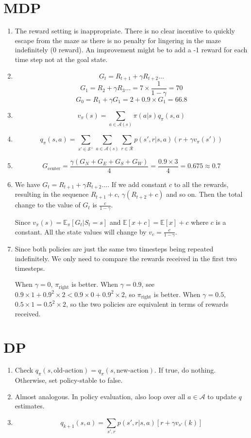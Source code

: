 \documentclass{article}
\newcommand{\allstates}{\mathcal{S}^+}
\newcommand{\actions}{\mathcal{A}}
\newcommand{\available}[1]{\mathcal{A}(#1)}
\newcommand{\rewards}{\mathcal{R}}
\newcommand{\rewardt}[1]{R_{#1}}
\newcommand{\policystateaction}[2]{\pi(#2|#1)}
\newcommand{\returnt}[1]{G_{#1}}
\newcommand{\valuestatepolicy}[2]{v_{#2}(#1)}
\newcommand{\valueaction}[2]{q_{#1}(#2)}
\newcommand{\Ex}{\mathbb{E}}
\begin{document}
\section{MDP}
\begin{enumerate}
    \item The reward setting is inappropriate. There is no clear incentive to quickly escape from the maze as there is no penalty for lingering in the maze indefinitely (0 reward). An improvement might be to add a -1 reward for each time step not at the goal state.
    \item \[ \returnt{t} = \rewardt{t+1} + \gamma \rewardt{t+2} \hdots \]
          \[ \returnt{1} = \rewardt{2} + \gamma \rewardt{3} \hdots = 7 \times \frac{1}{1-\gamma} = 70 \]
          \[ \returnt{0} = \rewardt{1} + \gamma\returnt{1} = 2 + 0.9 \times \returnt{1} = 66.8 \]
    \item \[ v_\pi(s) = \sum_{a \in \available{s}} \policystateaction{s}{a}\valueaction{\pi}{s, a} \]
    \item \[ \valueaction{\pi}{s, a} = \sum_{s' \in \allstates}\sum_{a \in \available{s}}\sum_{r \in \rewards} p(s', r|s, a)(r + \gamma\valuestatepolicy{s'}{\pi}) \]
    \item \[ G_{\text{center}} = \frac{\gamma(G_N + G_E + G_S + G_W)}{4} = \frac{0.9 \times 3}{4} = 0.675 \approx 0.7 \]
    \item We have $\returnt{t} = \rewardt{t+1} + \gamma\rewardt{t+2} \hdots$. If we add constant $c$ to all the rewards, resulting in the sequence $\rewardt{t+1}+c$, $\gamma(\rewardt{t+2}+c)$ and so on. Then the total change to the value of $\returnt{t}$ is $\frac{c}{1-\gamma}$.

          Since $v_\pi(s) = \Ex_\pi[G_t | S_t = s]$ and $\Ex[x+c] = \Ex[x] + c$ where $c$ is a constant. All the state values will change by $v_c = \frac{c}{1-\gamma}$.
    \item Since both policies are just the same two timesteps being repeated indefinitely. We only need to compare the rewards received in the first two timesteps.

          When $\gamma = 0$, $\pi_{\text{right}}$ is better. When $\gamma = 0.9$, see $0.9 \times 1 + 0.9^2 \times 2 < 0.9 \times 0 + 0.9^2 \times 2$, so $\pi_{\text{right}}$ is better. When $\gamma = 0.5$, $0.5 \times 1 = 0.5^2 \times 2$, so the two policies are equivalent in terms of rewards received.
\end{enumerate}

\section{DP}
\begin{enumerate}
    \item Check $\valueaction{\pi}{s, \text{old-action}} = \valueaction{\pi}{s, \text{new-action}}$. If true, do nothing. Otherwise, set policy-stable to false.
    \item Almost analogous. In policy evaluation, also loop over all $a \in \actions$ to update $q$ estimates.
    \item \[ \valueaction{k+1}{s, a} = \sum_{s', r} p(s', r|s, a)[r + \gamma \valuestatepolicy{k}{s'}] \]
\end{enumerate}
\end{document}
